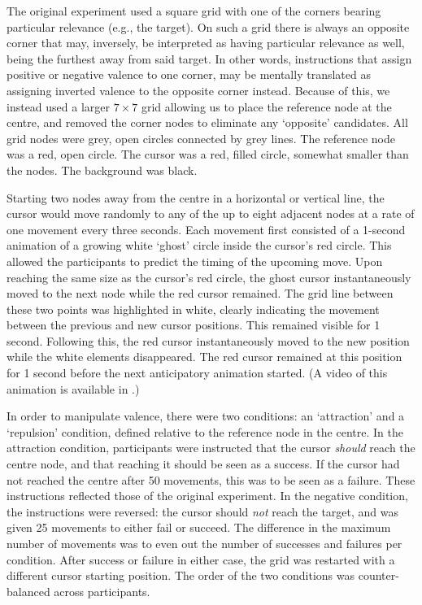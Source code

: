 The original experiment used a square grid with one of the corners bearing particular relevance (e.g., the target). On such a grid there is always an opposite corner that may, inversely, be interpreted as having particular relevance as well, being the furthest away from said target. In other words, instructions that assign positive or negative valence to one corner, may be mentally translated as assigning inverted valence to the opposite corner instead. Because of this, we instead used a larger $7\times7$ grid allowing us to place the reference node at the centre, and removed the corner nodes to eliminate any `opposite' candidates. All grid nodes were grey, open circles connected by grey lines. The reference node was a red, open circle. The cursor was a red, filled circle, somewhat smaller than the nodes. The background was black.

Starting two nodes away from the centre in a horizontal or vertical line, the cursor would move randomly to any of the up to eight adjacent nodes at a rate of one movement every three seconds. Each movement first consisted of a 1-second animation of a growing white `ghost' circle inside the cursor's red circle. This allowed the participants to predict the timing of the upcoming move. Upon reaching the same size as the cursor's red circle, the ghost cursor instantaneously moved to the next node while the red cursor remained. The grid line between these two points was highlighted in white, clearly indicating the movement between the previous and new cursor positions. This remained visible for 1 second. Following this, the red cursor instantaneously moved to the new position while the white elements disappeared. The red cursor remained at this position for 1 second before the next anticipatory animation started. (A video of this animation is available in .)

In order to manipulate valence, there were two conditions: an `attraction' and a `repulsion' condition, defined relative to the reference node in the centre. In the attraction condition, participants were instructed that the cursor \emph{should} reach the centre node, and that reaching it should be seen as a success. If the cursor had not reached the centre after 50 movements, this was to be seen as a failure. These instructions reflected those of the original experiment. In the negative condition, the instructions were reversed: the cursor should \emph{not} reach the target, and was given 25 movements to either fail or succeed. The difference in the maximum number of movements was to even out the number of successes and failures per condition. After success or failure in either case, the grid was restarted with a different cursor starting position. The order of the two conditions was counter-balanced across participants. 


